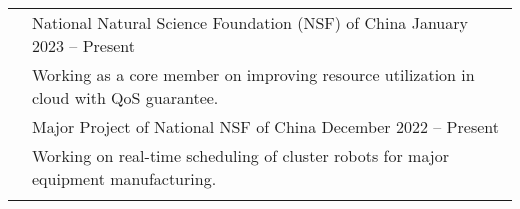 \documentclass[letterpaper, 10pt]{article}
\begin{document}
\begin{longtable}{p{}p{}}
& {National Natural Science Foundation (NSF) of China} \hfill January 2023 -- Present \\
& Working as a core member on improving resource utilization in cloud with QoS guarantee. \vspace{0.01\textwidth} \\

& {Major Project of National NSF of China} \hfill December 2022 -- Present \\
& Working on real-time scheduling of cluster robots for major equipment manufacturing. \\
& \\



%
%




\end{longtable}
\end{document}
